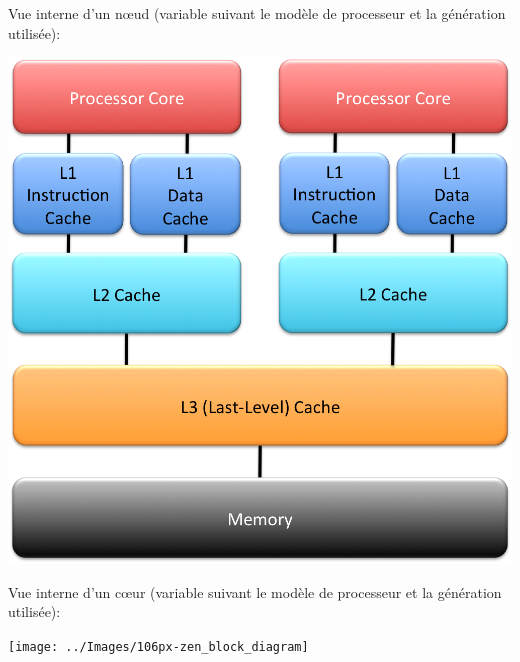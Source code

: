 \documentclass{beamer}
\begin{document}
\begin{frame}
Vue interne d'un n\oe ud (variable suivant le mod\`ele de processeur et la g\'en\'eration utilis\'ee):

\begin{center}
\includegraphics[scale=0.3]{../Images/architecture2}
\end{center}

\end{frame}

\begin{frame}
Vue interne d'un c\oe ur (variable suivant le mod\`ele de processeur et la g\'en\'eration utilis\'ee):

\begin{center}
	\texttt{[image: ../Images/106px-zen\_block\_diagram]}
\end{center}

\end{frame}
\end{document}
